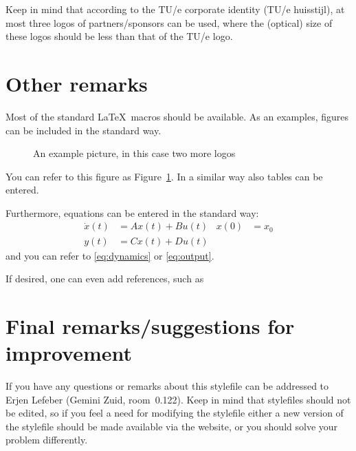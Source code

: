 \documentclass[a0,red]{opacpstr}
\newcommand{\vcenterbox}[1]{\ensuremath{\vcenter{\hbox{#1}}}}
\begin{document}
Keep in mind that according to the TU/e corporate identity (TU/e huisstijl), at
most three logos of partners/sponsors can be used, where the (optical) size of
these logos should be less than that of the TU/e logo.

\section{Other remarks}
Most of the standard \LaTeX\ macros should be available. As an examples,
figures can be included in the standard way.
\begin{figure}[htb]
\begin{center}
\hskip1cm
\end{center}
\caption{An example picture, in this case two more logos}
\label{fig:morelogos}
\end{figure}
You can refer to this figure as Figure~\ref{fig:morelogos}. In a similar way
also tables can be entered.

Furthermore, equations can be entered in the standard way:
\begin{subequations}
\label{eq:dynamics}
\begin{align}
\dot x(t) &= Ax(t)+Bu(t) & x(0)&=x_0 \\
y(t)      &= Cx(t)+Du(t)
\label{eq:output}
\end{align}
\end{subequations}
and you can refer to \eqref{eq:dynamics} or \eqref{eq:output}.

If desired, one can even add references, such as %

\section{Final remarks/suggestions for improvement}
If you have any questions or remarks about this stylefile can be addressed to
Erjen Lefeber (Gemini Zuid, room~0.122). Keep in mind that stylefiles should
not be edited, so if you feel a need for modifying the stylefile either a
new version of the stylefile should be made available via the website, or
you should solve your problem differently.
\fi

%
%
\end{document}
